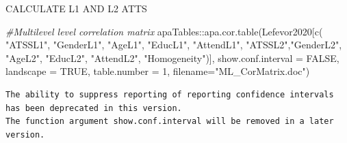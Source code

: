 \documentclass[
  english,
]{book}
\newenvironment{Shaded}{\begin{snugshade}}{\end{snugshade}}
\newcommand{\AttributeTok}[1]{\textcolor[rgb]{0.77,0.63,0.00}{#1}}
\newcommand{\CommentTok}[1]{\textcolor[rgb]{0.56,0.35,0.01}{\textit{#1}}}
\newcommand{\ConstantTok}[1]{\textcolor[rgb]{0.00,0.00,0.00}{#1}}
\newcommand{\DecValTok}[1]{\textcolor[rgb]{0.00,0.00,0.81}{#1}}
\newcommand{\FunctionTok}[1]{\textcolor[rgb]{0.00,0.00,0.00}{#1}}
\newcommand{\NormalTok}[1]{#1}
\newcommand{\OtherTok}[1]{\textcolor[rgb]{0.56,0.35,0.01}{#1}}
\newcommand{\SpecialCharTok}[1]{\textcolor[rgb]{0.00,0.00,0.00}{#1}}
\newcommand{\StringTok}[1]{\textcolor[rgb]{0.31,0.60,0.02}{#1}}
\begin{document}
\begin{Shaded}
\end{Shaded}

CALCULATE L1 AND L2 ATTS

\begin{Shaded}
\begin{Highlighting}[]
\CommentTok{\#Multilevel level correlation matrix}
\NormalTok{apaTables}\SpecialCharTok{::}\FunctionTok{apa.cor.table}\NormalTok{(Lefevor2020[}\FunctionTok{c}\NormalTok{(}
\StringTok{"ATSSL1"}\NormalTok{, }\StringTok{"GenderL1"}\NormalTok{, }\StringTok{"AgeL1"}\NormalTok{, }\StringTok{"EducL1"}\NormalTok{, }\StringTok{"AttendL1"}\NormalTok{,}
\StringTok{"ATSSL2"}\NormalTok{,}\StringTok{"GenderL2"}\NormalTok{, }\StringTok{"AgeL2"}\NormalTok{, }\StringTok{"EducL2"}\NormalTok{, }\StringTok{"AttendL2"}\NormalTok{, }\StringTok{"Homogeneity"}\NormalTok{)], }\AttributeTok{show.conf.interval =} \ConstantTok{FALSE}\NormalTok{, }\AttributeTok{landscape =} \ConstantTok{TRUE}\NormalTok{, }\AttributeTok{table.number =} \DecValTok{1}\NormalTok{, }\AttributeTok{filename=}\StringTok{"ML\_CorMatrix.doc"}\NormalTok{)}
\end{Highlighting}
\end{Shaded}

\begin{verbatim}
The ability to suppress reporting of reporting confidence intervals has been deprecated in this version.
The function argument show.conf.interval will be removed in a later version.
\end{verbatim}
\end{document}
